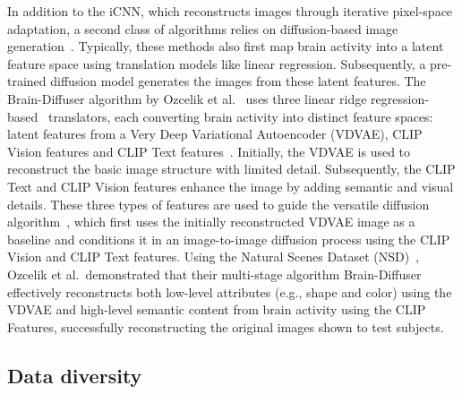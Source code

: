 In addition to the iCNN, which reconstructs images through iterative pixel-space adaptation, a second class of algorithms relies on diffusion-based image generation~\cite{takagiHighResolutionImageReconstruction,ozcelikNaturalSceneReconstruction2023,scottiMindEye2SharedSubjectModels2024}. Typically, these methods also first map brain activity into a latent feature space using translation models like linear regression. Subsequently, a pre-trained diffusion model generates the images from these latent features. The Brain-Diffuser algorithm by Ozcelik et al.~\cite{ozcelikNaturalSceneReconstruction2023} uses three linear ridge regression-based~\cite{hoerlRidgeRegressionBiased1970} translators, each converting brain activity into distinct feature spaces: latent features from a Very Deep Variational Autoencoder (VDVAE)\cite{childVeryDeepVAEs2020},  CLIP Vision features and CLIP Text features~\cite{radfordLearningTransferableVisual2021}. Initially, the VDVAE is used to reconstruct the basic image structure with limited detail. Subsequently, the CLIP Text and CLIP Vision features enhance the image by adding semantic and visual details. These three types of features are used to guide the versatile diffusion algorithm~\cite{xuVersatileDiffusionText2024}, which first uses the initially reconstructed VDVAE image as a baseline and conditions it in an image-to-image diffusion process using the CLIP Vision and CLIP Text features. Using the Natural Scenes Dataset (NSD)~\cite{allenMassive7TFMRI2022}, Ozcelik et al.\ demonstrated that their multi-stage algorithm Brain-Diffuser effectively reconstructs both low-level attributes (e.g., shape and color) using the VDVAE and high-level semantic content from brain activity using the CLIP Features, successfully reconstructing the original images shown to test subjects.

\subsection{Data diversity}


